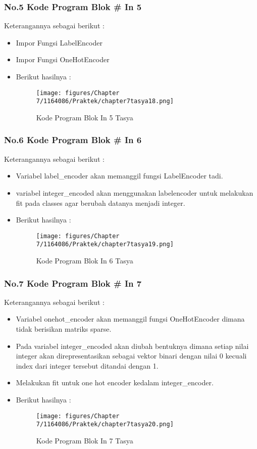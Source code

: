 \subsubsection{No.5 Kode Program Blok \# In 5}

Keterangannya sebagai berikut :
\begin{itemize}
\item Impor Fungsi LabelEncoder
\item Impor Fungsi OneHotEncoder
\item Berikut hasilnya :
\begin{figure}[ht]
\centering
\texttt{[image: figures/Chapter 7/1164086/Praktek/chapter7tasya18.png]}
\caption{Kode Program Blok In 5 Tasya}
\label{Praktek}
\end{figure}
\end{itemize}

\subsubsection{No.6 Kode Program Blok \# In 6}

Keterangannya sebagai berikut :
\begin{itemize}
\item Variabel label\_encoder akan memanggil fungsi LabelEncoder tadi.
\item variabel integer\_encoded akan menggunakan labelencoder untuk melakukan fit pada classes agar berubah datanya menjadi integer.
\item Berikut hasilnya :
\begin{figure}[ht]
\centering
\texttt{[image: figures/Chapter 7/1164086/Praktek/chapter7tasya19.png]}
\caption{Kode Program Blok In 6 Tasya}
\label{Praktek}
\end{figure}
\end{itemize}

\subsubsection{No.7 Kode Program Blok \# In 7}

Keterangannya sebagai berikut :
\begin{itemize}
\item Variabel onehot\_encoder akan memanggil fungsi OneHotEncoder dimana tidak berisikan matriks sparse.
\item Pada variabel integer\_encoded akan diubah bentuknya dimana setiap nilai integer akan direpresentasikan sebagai vektor binari dengan nilai 0 kecuali index dari integer tersebut ditandai dengan 1.
\item Melakukan fit untuk one hot encoder kedalam integer\_encoder.
\item Berikut hasilnya :
\begin{figure}[ht]
\centering
\texttt{[image: figures/Chapter 7/1164086/Praktek/chapter7tasya20.png]}
\caption{Kode Program Blok In 7 Tasya}
\label{Praktek}
\end{figure}
\end{itemize}

